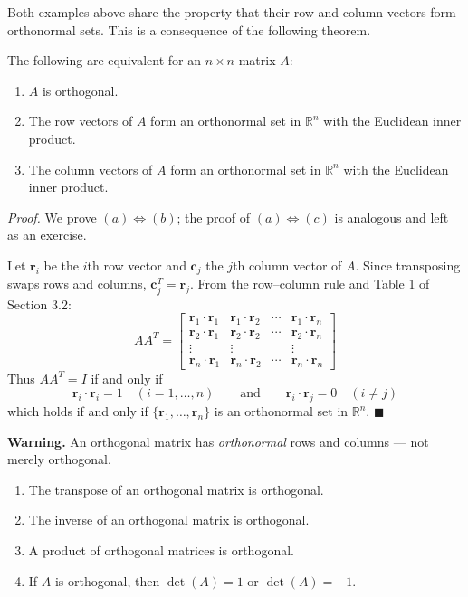 \documentclass{article}
\theoremstyle{mystyle}
\begin{document}
\vspace{2mm}
Both examples above share the property that their row and column vectors form orthonormal
sets. This is a consequence of the following theorem.

\begin{tcolorbox}[colback=red!4, colframe=red!60!black,
  title={\textbf{Theorem 7.1.1}}, boxrule=0.5mm, arc=3mm]
The following are equivalent for an $n\times n$ matrix $A$:
\begin{enumerate}
  \item[(a)] $A$ is orthogonal.
  \item[(b)] The row vectors of $A$ form an orthonormal set in $\mathbb{R}^n$ with the
             Euclidean inner product.
  \item[(c)] The column vectors of $A$ form an orthonormal set in $\mathbb{R}^n$ with
             the Euclidean inner product.
\end{enumerate}
\end{tcolorbox}

\textit{Proof.} We prove $(a)\Leftrightarrow(b)$; the proof of $(a)\Leftrightarrow(c)$ is analogous and left as an exercise.

Let $\mathbf{r}_i$ be the $i$th row vector and $\mathbf{c}_j$ the $j$th column vector of $A$.
Since transposing swaps rows and columns, $\mathbf{c}_j^T = \mathbf{r}_j$. From the row--column
rule and Table 1 of Section 3.2:
\[
  AA^T =
  \begin{bmatrix}
    \mathbf{r}_1\cdot\mathbf{r}_1 & \mathbf{r}_1\cdot\mathbf{r}_2 & \cdots & \mathbf{r}_1\cdot\mathbf{r}_n\\
    \mathbf{r}_2\cdot\mathbf{r}_1 & \mathbf{r}_2\cdot\mathbf{r}_2 & \cdots & \mathbf{r}_2\cdot\mathbf{r}_n\\
    \vdots & \vdots & & \vdots\\
    \mathbf{r}_n\cdot\mathbf{r}_1 & \mathbf{r}_n\cdot\mathbf{r}_2 & \cdots & \mathbf{r}_n\cdot\mathbf{r}_n
  \end{bmatrix}
\]
Thus $AA^T = I$ if and only if
\[
  \mathbf{r}_i\cdot\mathbf{r}_i = 1 \quad (i=1,\ldots,n)
  \qquad\text{and}\qquad
  \mathbf{r}_i\cdot\mathbf{r}_j = 0 \quad (i\neq j)
\]
which holds if and only if $\{\mathbf{r}_1,\ldots,\mathbf{r}_n\}$ is an orthonormal set in $\mathbb{R}^n$. $\blacksquare$

\textbf{Warning.} An orthogonal matrix has \emph{orthonormal} rows and columns --- not merely orthogonal.

\begin{tcolorbox}[colback=red!4, colframe=red!60!black,
  title={\textbf{Theorem 7.1.2}}, boxrule=0.5mm, arc=3mm]
\begin{enumerate}
  \item[(a)] The transpose of an orthogonal matrix is orthogonal.
  \item[(b)] The inverse of an orthogonal matrix is orthogonal.
  \item[(c)] A product of orthogonal matrices is orthogonal.
  \item[(d)] If $A$ is orthogonal, then $\det(A)=1$ or $\det(A)=-1$.
\end{enumerate}
\end{tcolorbox}
\end{document}
